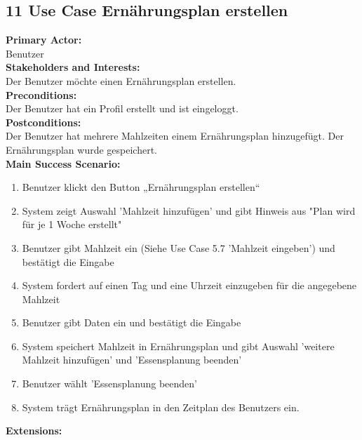 \documentclass[12pt,a4paper,onecolumn]{article}
\begin{document}
\subsection{11 Use Case Ernährungsplan erstellen}
\textbf{Primary Actor:}\\ Benutzer\\
\textbf{Stakeholders and Interests:}\\
Der Benutzer möchte einen \gls{Ernährungsplan} erstellen.\\
\textbf{Preconditions:} \\ Der Benutzer hat ein Profil erstellt und ist eingeloggt.\\
\textbf{Postconditions:}\\Der Benutzer hat mehrere \gls{Mahlzeit}en einem \gls{Ernährungsplan} hinzugefügt. Der \gls{Ernährungsplan} wurde gespeichert.\\
\textbf{Main Success Scenario:}
\begin{enumerate}
    \item Benutzer klickt den Button „Ernährungsplan erstellen“
    \item System zeigt Auswahl 'Mahlzeit hinzufügen' und gibt Hinweis aus "Plan wird für je 1 Woche erstellt" 
    \item Benutzer gibt \gls{Mahlzeit} ein (Siehe Use Case 5.7 'Mahlzeit eingeben') und bestätigt die Eingabe
    \item System fordert auf einen Tag und eine Uhrzeit einzugeben für die angegebene \gls{Mahlzeit}
    \item Benutzer gibt Daten ein und bestätigt die Eingabe
    \item System speichert \gls{Mahlzeit} in \gls{Ernährungsplan} und gibt Auswahl 'weitere Mahlzeit hinzufügen' und 'Essensplanung beenden'
    \item Benutzer wählt 'Essensplanung beenden'
    \item System trägt Ernährungsplan in den \gls{Zeitplan} des Benutzers ein.
\end{enumerate}
\textbf{Extensions:}
\end{document}
